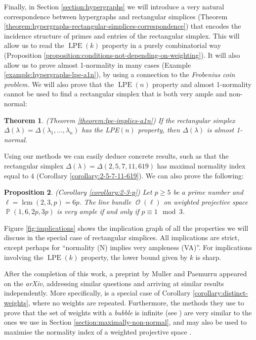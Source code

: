 \documentclass[a4paper,11pt]{amsart}
\theoremstyle{plain}
\newtheorem{theorem}{Theorem}[section]
\newtheorem{proposition}[theorem]{Proposition}
\theoremstyle{definition}
\theoremstyle{remark}
\DeclareMathOperator{\PP}{\mathbb{P}}
\DeclareMathOperator{\cO}{\mathcal{O}}
\DeclareMathOperator{\lcm}{lcm}
\DeclareMathOperator{\LPE}{LPE}
\begin{document}
Finally, in Section \ref{section:hypergraphs} we will introduce a very natural correspondence between hypergraphs and rectangular simplices (Theorem \ref{theorem:hypergraphs-rectangular-simplices-correspondence}) that encodes the incidence structure of primes and entries of the rectangular simplex. This will allow us to read the $\LPE(k)$ property in a purely combinatorial way (Proposition \ref{proposition:conditions-not-depending-on-weighting}). It will also allow us to prove almost 1-normality in many cases (Example \ref{example:hypergraphs-lpe-a1n}), by using a connection to the \emph{Frobenius coin problem.} We will also prove that the $\LPE(n)$ property and almost 1-normality cannot be used to find a rectangular simplex that is both very ample and non-normal:

\begin{theorem}(Theorem \ref{theorem:lpe-implies-a1n}) If the rectangular simplex $\Delta(\lambda) = \Delta(\lambda_1, \ldots, \lambda_n)$ has the LPE$(n)$ property, then $\Delta(\lambda)$ is almost 1-normal.
\end{theorem}

Using our methods we can easily deduce concrete results, such as that the rectangular simplex $\Delta(\lambda) = \Delta(2, 5, 7, 11, 619)$ has maximal normality index equal to $4$ (Corollary \ref{corollary:2-5-7-11-619}).
We can also prove the following:

\begin{proposition}(Corollary \ref{corollary:2-3-p})
    Let $p\geq 5$ be a prime number and $\ell = \lcm(2,3,p) = 6p$.
    The line bundle $\cO(\ell)$ on weighted projective space $\PP(1,6,2p,3p)$ is very ample if and only if $p \equiv 1 \mod 3$.
\end{proposition}

Figure \ref{fig:implications} shows the implication graph of all the properties we will discuss in the special case of rectangular simplices. All implications are strict, except perhaps for ``normality (N) implies very ampleness (VA)''. For implications involving the $\LPE(k)$ property, the lower bound given by $k$ is sharp.

After the completion of this work, a preprint by Muller and Paemurru \cite{MullerPaemurru:2025} appeared on the \emph{arXiv}, addressing similar questions and arriving at similar results independently.
More specifically, \cite[Theorem 1.14]{MullerPaemurru:2025} is a special case of Corollary \ref{corollary:distinct-weights}, where no weights are repeated.
Furthermore, the methods they use to prove that the set of weights with a \emph{bubble} is infinite (see \cite[Section 7]{MullerPaemurru:2025}) are very similar to the ones we use in Section \ref{section:maximally-non-normal}, and may also be used to maximise the normality index of a weighted projective space \cite[Theorem 7.5]{MullerPaemurru:2025}.
\end{document}
